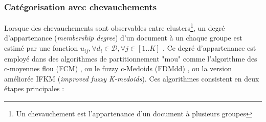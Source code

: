 
\subsubsection{Catégorisation avec chevauchements}

Lorsque des chevauchements sont observables entre clusters\footnote{Un chevauchement est l'appartenance d'un document à plusieurs groupes}, un degré d'appartenance (\textit{membership degree}) d'un document à un chaque groupe est estimé par une fonction $u_{ij}, \forall d_i \in \mathcal{D}, \forall j \in [1..K]$  \citep{baraldi1999surveyfuzzyclstering}. Ce degré d'appartenance est employé dans des algorithmes de partitionnement "mou" comme l'algorithme des c-moyennes flou (FCM) \citep{bezdek1984fcm, hathaway1989fuzzycmeans}, ou le fuzzy c-Medoids (FDMdd) \citep{krishnapuram2001fuzzycmedoids}, ou la version améliorée IFKM (\textit{improved fuzzy K-medoids})\citep{sabzi2011fuzzykmedoids}.  Ces algorithmes consistent en deux étapes principales \citep{sabzi2011fuzzykmedoids}: 


